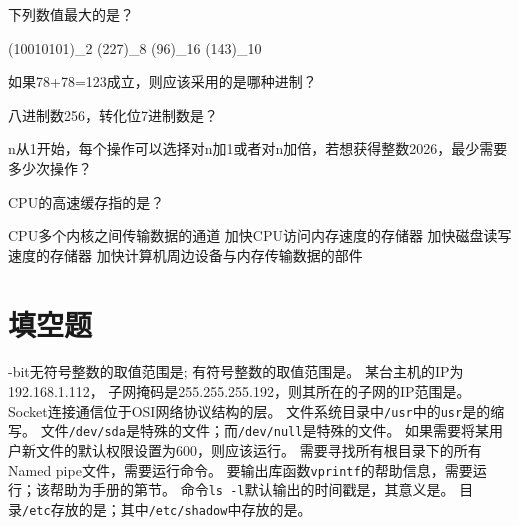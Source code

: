 \documentclass[addpoints,12pt,answers]{exam}
\begin{document}
\begin{CJK*}{UTF8}{gbsn}
\begin{questions}
\question[2]
下列数值最大的是？
\begin{choices}
	\choice (10010101)\_2
	\choice (227)\_8
	\choice (96)\_16
	\choice (143)\_10
\end{choices}
\answerline

\question[2]
如果78+78=123成立，则应该采用的是哪种进制？
\begin{choices}
\end{choices}
\answerline


\question[2]
八进制数256，转化位7进制数是？
\begin{choices}
\end{choices}
\answerline

\question[2]
n从1开始，每个操作可以选择对n加1或者对n加倍，若想获得整数2026，最少需要多少次操作？
\begin{choices}
\end{choices}
\answerline


\question[2]
CPU的高速缓存指的是？
\begin{choices}
	\choice CPU多个内核之间传输数据的通道
	\choice 加快CPU访问内存速度的存储器
	\choice 加快磁盘读写速度的存储器
	\choice 加快计算机周边设备与内存传输数据的部件
\end{choices}
\answerline
\end{questions}

\newpage

\section{填空题}

\begin{questions}
	-bit无符号整数的取值范围是\fillin[]; 有符号整数的取值范围是\fillin[][1in]。
	\question[2] 某台主机的IP为192.168.1.112， 子网掩码是255.255.255.192，则其所在的子网的IP范围是\fillin[][1in]。
	\question[2] Socket连接通信位于OSI网络协议结构的\fillin[]层。
	\question[2] 文件系统目录中\texttt{/usr}中的\texttt{usr}是\fillin[][1in]的缩写。
	\question[2] 文件\texttt{/dev/sda}是特殊的\fillin[][1in]文件；而\texttt{/dev/null}是特殊的\fillin[][1in]文件。
	\question[2] 如果需要将某用户新文件的默认权限设置为600，则应该运行\fillin[][1in]。
	\question[2] 需要寻找所有根目录下的所有Named pipe文件，需要运行命令\fillin[][1in]。
	\question[2] 要输出库函数\texttt{vprintf}的帮助信息，需要运行\fillin[][1in]；该帮助为手册的第\fillin[]节。
	\question[2] 命令\texttt{ls -l}默认输出的时间戳是\fillin[]，其意义是\fillin[][2in]。
	\question[2] 目录\texttt{/etc}存放的是\fillin[][2in]；其中\texttt{/etc/shadow}中存放的是\fillin[][2in]。
\end{questions}

\end{CJK*}
\end{document}
